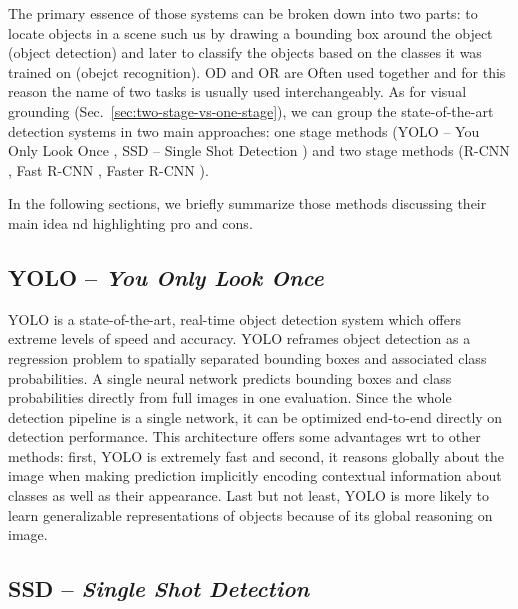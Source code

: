 The primary essence of those systems can be broken down into two
parts: to locate objects in a scene such us by drawing a bounding box
around the object (object detection) and later to classify the objects
based on the classes it was trained on (obejct recognition). OD and OR
are Often used together and for this reason the name of two tasks is
usually used interchangeably. As for visual grounding
(Sec.~\ref{sec:two-stage-vs-one-stage}), we can group the
state-of-the-art detection systems in two main approaches: one stage
methods (YOLO -- You Only Look Once \cite{redmon2016you}, SSD -- Single
Shot Detection \cite{liu2016ssd}) and two stage methods (R-CNN
\cite{girshick2014rich}, Fast R-CNN \cite{girshick2015fast}, Faster
R-CNN \cite{ren2015faster}). 

In the following sections, we briefly summarize those methods
discussing their main idea nd highlighting pro and cons.

\subsection{YOLO -- \emph{You Only Look Once}}
\label{subsec:yolo}

YOLO \cite{redmon2016you} is a state-of-the-art, real-time object
detection system which offers extreme levels of speed and accuracy.
YOLO reframes object detection as a regression problem to spatially
separated bounding boxes and associated class probabilities. A single
neural network predicts bounding boxes and class probabilities
directly from full images in one evaluation. Since the whole detection
pipeline is a single network, it can be optimized end-to-end directly
on detection performance. This architecture offers some advantages wrt
to other methods: first, YOLO is extremely fast and second, it reasons
globally about the image when making prediction implicitly encoding
contextual information about classes as well as their appearance. Last
but not least, YOLO is more likely to learn generalizable
representations of objects because of its global reasoning on image.

\subsection{SSD -- \emph{Single Shot Detection}}

